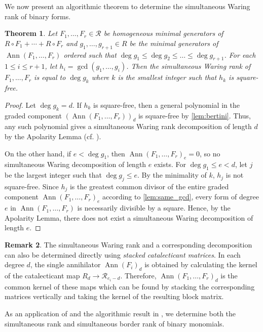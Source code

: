 \documentclass[a4paper, 11pt]{amsart}
\newtheorem{theorem}{Theorem}
\numberwithin{theorem}{section}
\theoremstyle{definition}
\newtheorem{remark}[theorem]{Remark}
\numberwithin{equation}{section}
\DeclareMathOperator{\Ann}{\operatorname{Ann}}
\begin{document}
We now present an algorithmic theorem to determine the simultaneous Waring rank of binary forms.
\begin{theorem}\label{thm:simultaneousrankalgorithm}
    Let $F_1, \dots, F_r\in \mathcal{R}$ be homogeneous minimal generators of $R\circ F_1 + \cdots + R\circ F_r$ and $g_1, \dots, g_{r+1} \in R$ be the minimal generators of $\Ann(F_1, \dots, F_r)$ ordered such that $\deg g_1 \leq \deg g_2 \leq \dots \leq \deg g_{r+1}$.
    For each $1 \leq i \leq r+1$, let $h_i = \gcd(g_1, \dots, g_i)$. 
    Then the simultaneous Waring rank of $F_1, \dots, F_r$ is equal to $\deg g_k$ where $k$ is the smallest integer such that $h_k$ is square-free.
\end{theorem}
\begin{proof}
    Let $\deg g_k = d$.
    If $h_k$ is square-free, then a general polynomial in the graded component $(\Ann(F_1,\dots,F_r))_d$ is square-free by \eqref{lem:bertini}.
    Thus, any such polynomial gives a simultaneous Waring rank decomposition of length $d$ by the Apolarity Lemma (cf. \cite[Lemma 1.31]{MR1735271}).

    On the other hand, if $e<\deg g_1$, then $\Ann(F_1,\dots,F_r)_e=0$, so no simultaneous Waring decomposition of length $e$ exists. 
    For $\deg g_1\leq e < d$, let $j$ be the largest integer such that $\deg g_j\leq e$.
    By the minimality of $k$, $h_j$ is not square-free. 
    Since $h_j$ is the greatest common divisor of the entire graded component $\Ann(F_1, \dots, F_r)_e$ according to \eqref{lem:same_gcd}, every form of degree $e$ in $\Ann(F_1, \dots, F_r)$ is necessarily divisible by a square. 
    Hence, by the Apolarity Lemma, there does not exist a simultaneous Waring decomposition of length $e$.
\end{proof}
\begin{remark}\label{rem:simultaneousCatalecticants}
The simultaneous Waring rank and a corresponding decomposition can also be determined directly using \emph{stacked catalecticant matrices}.
In each degree $d$, the single annihilator $\Ann(F_i)_d$ is obtained by calculating the kernel of the catalecticant map
$R_d \to \mathcal{R}_{e_i-d}$.
Therefore, $\Ann(F_1,\ldots,F_r)_d$ is the common kernel of these maps which can be found by stacking the corresponding matrices vertically and taking the kernel of the resulting block matrix.
\end{remark}
As an application of  and the algorithmic result in , we determine both the simultaneous rank and simultaneous border rank of binary monomials.
\end{document}

